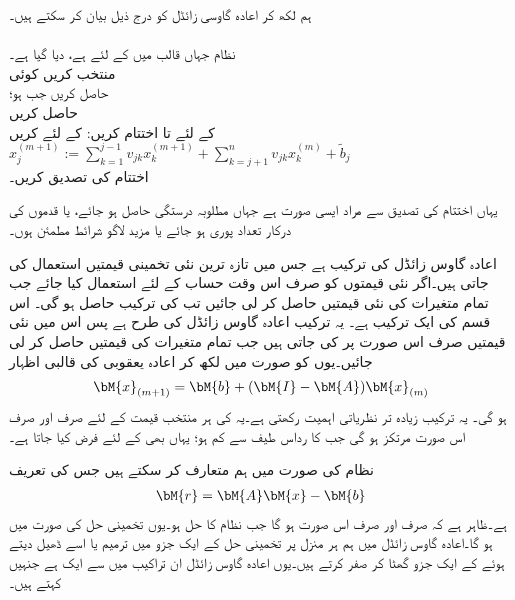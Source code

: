 ہم  لکھ کر اعادہ گاوسی زائڈل کو درج ذیل بیان کر سکتے ہیں۔\\

\noindent\makebox[\linewidth]{\rule{\textwidth}{0.4pt}}
\\
نظام  جہاں  قالب  میں  کے لئے  ہے، دیا گیا ہے۔\\
منتخب کریں کوئی \\
حاصل کریں  جب  ہو؛ \\
حاصل کریں \\
 کے لئے  تا اختتام کریں:
 کے لئے کریں\\
$x_j^{(m+1)}:=\sum\limits_{k=1}^{j-1}v_{jk}x_k^{(m+1)}+\sum\limits_{k=j+1}^{n}v_{jk}x_k^{(m)}+\tilde{b}_j$\\
اختتام کی تصدیق کریں۔\\
\noindent\makebox[\linewidth]{\rule{\textwidth}{0.4pt}}

یہاں اختتام کی تصدیق سے مراد ایسی صورت ہے جہاں مطلوبہ درستگی حاصل ہو جائے، یا قدموں کی درکار تعداد پوری ہو جائے یا مزید لاگو شرائط مطمئن ہوں۔

اعادہ گاوس زائڈل  کی ترکیب ہے جس میں تازہ ترین نئی تخمینی قیمتیں استعمال کی جاتی ہیں۔اگر  نئی قیمتوں کو صرف اس وقت حساب کے لئے استعمال کیا جائے جب تمام متغیرات کی نئی قیمتیں حاصل کر لی جائیں تب  کی ترکیب حاصل ہو گی۔ اس قسم کی ایک ترکیب ہے۔ یہ ترکیب اعادہ گاوس زائڈل کی طرح ہے پس اس میں نئی قیمتیں صرف اس صورت پر کی جاتی ہیں جب تمام متغیرات کی قیمتیں حاصل کر لی جائیں۔یوں  کو  صورت میں لکھ کر اعادہ یعقوبی کی قالبی اظہار
\begin{align}\label{مساوات_خطی_اعدادی_مثال_ث}
\bM{x}_{(m+1)}=\bM{b}+(\bM{I}-\bM{A})\bM{x}_{(m)}
\end{align}
ہو گی۔ یہ ترکیب زیادہ تر نظریاتی اہمیت رکھتی ہے۔یہ  کی ہر منتخب قیمت کے لئے صرف اور صرف اس صورت مرتکز ہو گی جب    کا رداس طیف  سے کم ہو؛ یہاں بھی  کے لئے  فرض کیا جاتا ہے۔

نظام  کی صورت میں ہم    متعارف کر سکتے ہیں جس کی تعریف
\begin{align*}
\bM{r}=\bM{A}\bM{x}-\bM{b}
\end{align*}
ہے۔ظاہر ہے کہ  صرف اور صرف اس صورت ہو گا جب  نظام کا حل ہو۔یوں تخمینی حل کی صورت میں  ہو گا۔اعادہ گاوس زائڈل میں ہم ہر منزل پر تخمینی حل کے ایک جزو میں ترمیم یا اسے ڈھیل دیتے ہوئے  کے ایک جزو  گھٹا کر صفر کرتے ہیں۔یوں اعادہ گاوس زائڈل ان تراکیب میں سے ایک ہے جنہیں  کہتے ہیں۔ 

